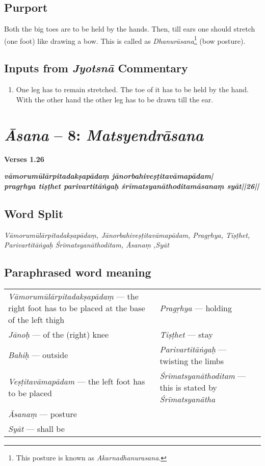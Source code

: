 \subsection*{Purport}

Both the big toes are to be held by the hands. Then, till ears one should stretch (one foot)  like drawing a bow. This is called as \textit{Dhanurāsana}\footnote{This posture is known as \textit{Akarnadhanurasana}.} (bow posture).

\subsection*{Inputs from \textit{Jyotsnā} Commentary}

\begin{enumerate}
\item One leg has to remain stretched. The toe of it has to be held by the hand.  With the other hand the other leg has to be drawn till the ear. 
\end{enumerate}

\section*{\textit{Āsana} -- 8: \textit{Matsyendrāsana}}

\noindent \textbf{Verses 1.26}

\begin{shloka}
\textit{\textbf{vāmorumūlārpitadakṣapādaṃ jānorbahiveṣṭitavāmapādam|}\\
\textbf{pragṛhya tiṣṭhet parivartitāṅgaḥ śrīmatsyanāthoditamāsanaṃ syāt||26||}}
\end{shloka}
\vspace{-10pt}

\subsection*{Word Split}

\textit{Vāmorumūlārpitadakṣapādaṃ, Jānorbahiveṣṭitavāmapādam, Pragṛhya, Tiṣṭhet, Parivartitāṅgaḥ Śrīmatsyanāthoditam, Āsanaṃ ,Syāt}

\subsection*{Paraphrased word meaning}
\vspace{-10pt}

\begin{longtable}{>{\noindent\raggedright}p{5cm}>{\noindent\raggedright}p{5cm}}
\textit{Vāmorumūlārpitadakṣapādaṃ} --- the right foot has to be placed at the base of the left thigh  & \textit{Pragṛhya} --- holding \tabularnewline
\textit{Jānoḥ} --- of the (right) knee & \textit{Tiṣṭhet} --- stay\tabularnewline
\textit{Bahiḥ} --- outside  & \textit{Parivartitāṅgaḥ} --- twisting the limbs\tabularnewline
\textit{Veṣṭitavāmapādam} --- the left foot has to be placed  & \textit{Śrīmatsyanāthoditam} --- this is stated by \textit{Śrīmatsyanātha}\tabularnewline
\textit{Āsanaṃ} --- posture & \tabularnewline
\textit{Syāt} --- shall be & 
\end{longtable}
\vspace{-10pt}

